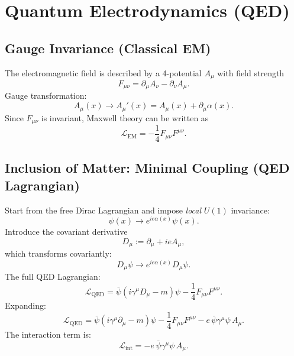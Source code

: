 \section{Quantum Electrodynamics (QED)}

\subsection{Gauge Invariance (Classical EM)}
The electromagnetic field is described by a 4-potential $A_\mu$ with field strength
\begin{equation}
F_{\mu\nu}=\partial_\mu A_\nu-\partial_\nu A_\mu.
\end{equation}
Gauge transformation:
\begin{equation}
A_\mu(x)\to A_\mu'(x)=A_\mu(x)+\partial_\mu\alpha(x).
\end{equation}
Since $F_{\mu\nu}$ is invariant, Maxwell theory can be written as
\begin{equation}
\mathcal{L}_{\mathrm{EM}}=-\frac14 F_{\mu\nu}F^{\mu\nu}.
\end{equation}

\subsection{Inclusion of Matter: Minimal Coupling (QED Lagrangian)}
Start from the free Dirac Lagrangian and impose \emph{local} $U(1)$ invariance:
\begin{equation}
\psi(x)\to e^{ie\alpha(x)}\psi(x).
\end{equation}
Introduce the covariant derivative
\begin{equation}
D_\mu := \partial_\mu + ie A_\mu,
\end{equation}
which transforms covariantly:
\begin{equation}
D_\mu\psi \to e^{ie\alpha(x)}D_\mu\psi.
\end{equation}
The full QED Lagrangian:
\begin{equation}
\mathcal{L}_{\mathrm{QED}}
=
\bar{\psi}(i\gamma^\mu D_\mu - m)\psi
-\frac14 F_{\mu\nu}F^{\mu\nu}.
\end{equation}
Expanding:
\begin{equation}
\mathcal{L}_{\mathrm{QED}}
=
\bar{\psi}(i\gamma^\mu\partial_\mu-m)\psi
-\frac14 F_{\mu\nu}F^{\mu\nu}
-e\,\bar{\psi}\gamma^\mu\psi\,A_\mu.
\end{equation}
The interaction term is:
\begin{equation}
\mathcal{L}_{\mathrm{int}}=-e\,\bar{\psi}\gamma^\mu\psi\,A_\mu.
\end{equation}

